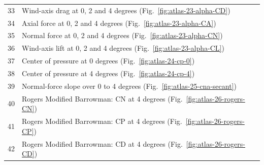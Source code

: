 \documentclass[oneside,openany]{amsdtx}
\begin{document}
{\begin{longtable}{@{}rL{.84\textwidth}@{}}
33 & Wind-axis drag at 0, 2 and 4 degrees (Fig.~\ref{fig:atlas-23-alpha-CD})\\

34 & Axial force at 0, 2 and 4 degrees (Fig.~\ref{fig:atlas-23-alpha-CA})\\

35 & Normal force at 0, 2 and 4 degrees (Fig.~\ref{fig:atlas-23-alpha-CN})\\

36 & Wind-axis lift at 0, 2 and 4 degrees (Fig.~\ref{fig:atlas-23-alpha-CL})\\

37 & Center of pressure at 0 degrees (Fig.~\ref{fig:atlas-24-cp-0})\\

38 & Center of pressure at 4 degrees (Fig.~\ref{fig:atlas-24-cp-4})\\

39 & Normal-force slope over 0 to 4 degrees (Fig.~\ref{fig:atlas-25-cna-secant})\\

40 & Rogers Modified Barrowman: CN at 4 degrees (Fig.~\ref{fig:atlas-26-rogers-CN})\\

41 & Rogers Modified Barrowman: CP at 4 degrees (Fig.~\ref{fig:atlas-26-rogers-CP})\\

42 & Rogers Modified Barrowman: CD at 4 degrees (Fig.~\ref{fig:atlas-26-rogers-CD})\\

\bottomrule\end{longtable}}

\end{document}
